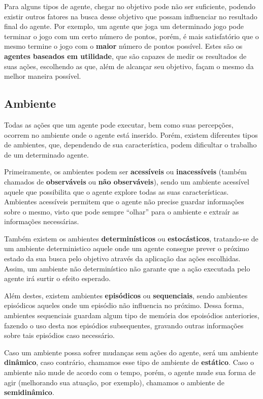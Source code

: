 Para alguns tipos de agente, chegar no objetivo pode não ser suficiente,
podendo existir outros fatores na busca desse objetivo que possam influenciar
no resultado final do agente. Por exemplo, um agente que joga um determinado
jogo pode terminar o jogo com um certo número de pontos, porém, é mais
satisfatório que o mesmo termine o jogo com o \textbf{maior} número de pontos
possível. Estes são os \textbf{agentes baseados em utilidade}, que são capazes
de medir os resultados de suas ações, escolhendo as que, além de alcançar seu
objetivo, façam o mesmo da melhor maneira possível.

\subsection{Ambiente}
Todas as ações que um agente pode executar, bem como suas percepções, ocorrem no
ambiente onde o agente está inserido. Porém, existem diferentes tipos de
ambientes, que, dependendo de sua característica, podem dificultar o trabalho de
um determinado agente.

Primeiramente, os ambientes podem ser \textbf{acessíveis} ou
\textbf{inacessíveis} (também chamados de \textbf{observáveis} ou \textbf{não
observáveis}), sendo um ambiente acessível aquele que possibilita que o agente
explore todas as suas características. Ambientes acessíveis permitem que o
agente não precise guardar informações sobre o mesmo, visto que pode sempre
``olhar'' para o ambiente e extraír as informações necessárias.

Também existem os ambientes \textbf{determinísticos} ou \textbf{estocásticos},
tratando-se de um ambiente deterministico aquele onde um agente consegue prever
o próximo estado da sua busca pelo objetivo através da aplicação das ações
escolhidas. Assim, um ambiente não determinístico não garante que a ação
executada pelo agente irá surtir o efeito esperado.

Além destes, existem ambientes \textbf{episódicos} ou \textbf{sequenciais},
sendo ambientes episódicos aqueles onde um episódio não influencia no próximo.
Dessa forma, ambientes sequenciais guardam algum tipo de memória dos epoisódios
anteriories, fazendo o uso desta nos episódios subsequentes, gravando outras
informações sobre tais episódios caso necessário.

Caso um ambiente possa sofrer mudanças sem ações do agente, será um ambiente
\textbf{dinâmico}, caso contrário, chamamos esse tipo de ambiente de
\textbf{estático}. Caso o ambiente não mude de acordo com o tempo, porém, o
agente mude sua forma de agir (melhorando sua atuação, por exemplo), chamamos
o ambiente de \textbf{semidinâmico}.

